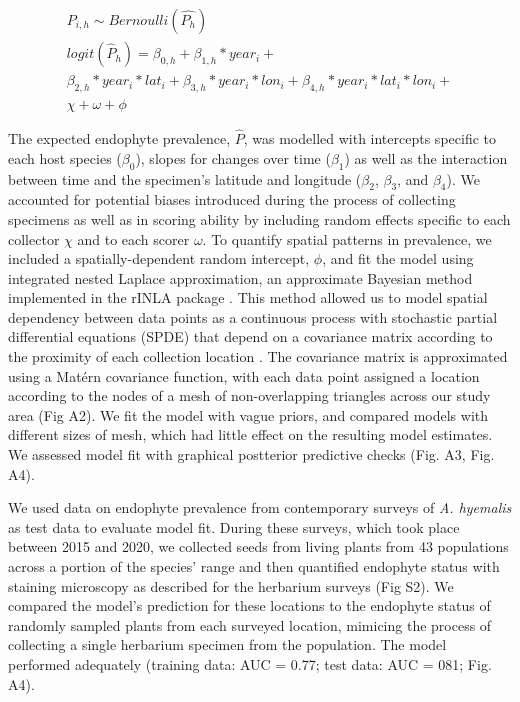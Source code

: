 \documentclass[11pt]{article}
\begin{document}
\begin{subequations}
		\label{eq:trends}
		\begin{align}
		P_{i,h} \sim Bernoulli(\hat{P_{h}}) \\
			logit(\hat{P}_{h}) = \beta_{0,h} + 
		\beta_{1,h}*year_{i} + \\
		\beta_{2,h}*year_{i} *lat_{i} + 
		\beta_{3,h}*year_{i} *lon_{i} + 
		\beta_{4,h}*year_{i} *lat_{i}*lon_{i} +\\
		\chi + \omega + \phi
		\end{align}
\end{subequations}

The expected endophyte prevalence, $\hat{P}$, was modelled with intercepts specific to each host species ($\beta_{0}$), slopes for changes over time ($\beta_{1}$) as well as the interaction between time and the specimen's latitude and longitude ($\beta_{2}$, $\beta_{3}$, and $\beta_{4}$). 
We accounted for potential biases introduced during the process of collecting specimens as well as in scoring ability by including random effects specific to each collector $\chi$ and to each scorer $\omega$.
To quantify spatial patterns in prevalence, we included a spatially-dependent random intercept, $\phi$, and fit the model using integrated nested Laplace approximation, an approximate Bayesian method implemented in the rINLA package \citep{lindgren2015bayesian}. 
This method allowed us to model spatial dependency between data points as a continuous process with stochastic partial differential equations (SPDE) that depend on a covariance matrix according to the proximity of each collection location \citep{lindgren2011explicit,bakka2018spatial}. 
The covariance matrix is approximated using a Matérn covariance function, with each data point assigned a location according to the nodes of a mesh of non-overlapping triangles across our study area (Fig A2).
We fit the model with vague priors, and compared models with different sizes of mesh, which had little effect on the resulting model estimates.
We assessed model fit with graphical postterior predictive checks (Fig. A3, Fig. A4).

We used data on endophyte prevalence from  contemporary surveys of \emph{A. hyemalis} as test data to evaluate model fit. 
During these surveys, which took place between 2015 and 2020, we collected seeds from living plants from 43 populations across a portion of the species' range and then quantified endophyte status with staining microscopy as described for the herbarium surveys (Fig S2).
We compared the model's prediction for these locations to the endophyte status of randomly sampled plants from each surveyed location, mimicing the process of collecting a single herbarium specimen from the population.
The model performed adequately (training data: AUC = 0.77; test data: AUC = 081; Fig. A4). 
\end{document}
